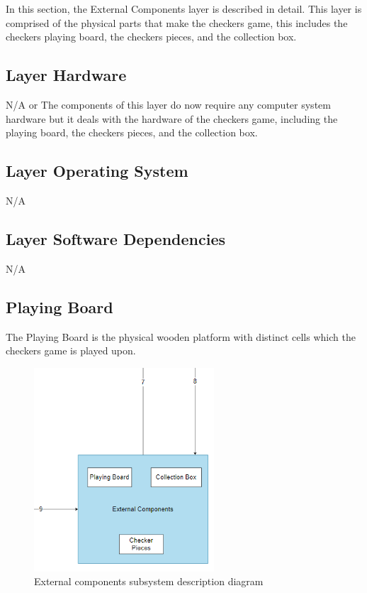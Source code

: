 In this section, the External Components layer is described in detail. This layer is comprised of the physical parts that make the checkers game, this includes the checkers playing board, the checkers pieces, and the collection box.

\subsection{Layer Hardware}
N/A or The components of this layer do now require any computer system hardware but it deals with the hardware of the checkers game, including the playing board, the checkers pieces, and the collection box.

\subsection{Layer Operating System}
N/A

\subsection{Layer Software Dependencies}
N/A

\subsection{Playing Board}
The Playing Board is the physical wooden platform with distinct cells which the checkers game is played upon. 

\begin{figure}[h!]
	\centering
 	\includegraphics[width=0.60\textwidth]{images/externalComponents_subsystem.png}
 \caption{External components subsystem description diagram}
\end{figure}

